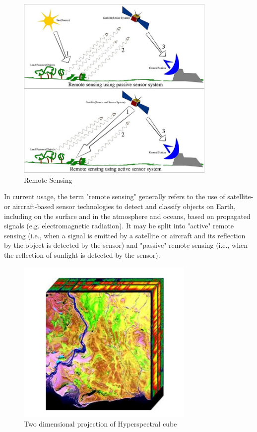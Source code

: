 \documentclass[document.tex]{subfiles}
\begin{document}
\begin{figure}[H]
	\begin{center}
		\includegraphics[height=9.0cm]{imgs/Remote_Sensing.jpg}
	\end{center}
	\caption{Remote Sensing\cite{32}}
	\label{fig: Remote Sensing}
\end{figure}

\noindent In current usage, the term "remote sensing" generally refers to the use of satellite- or aircraft-based sensor technologies to detect and classify objects on Earth, including on the surface and in the atmosphere and oceans, based on propagated signals (e.g. electromagnetic radiation). It may be split into "active" remote sensing (i.e., when a signal is emitted by a satellite or aircraft and its reflection by the object is detected by the sensor) and "passive" remote sensing (i.e., when the reflection of sunlight is detected by the sensor).
\begin{figure}[H]
	\begin{center}
		\includegraphics[height=8.0cm]{imgs/cube.png}
	\end{center}
	\caption{Two dimensional projection
		of Hyperspectral cube\cite{31}}
	\label{Two dimensional projection
		of Hyperspectral cube}
\end{figure}
\end{document}
